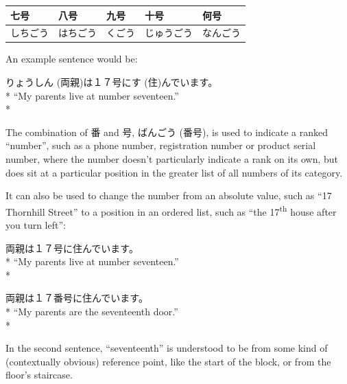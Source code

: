 \documentclass[11pt, b5paper, twoside, openright, onecolumn]{book}
\makeatletter
\newcommand*{\rubystack}[2]{{\relscale{0.5}%
  \begin{tabular}[b]{@{}c@{}}%
    {#1}\\%
   {\textscale{2}{#2}}%
  \end{tabular}}%
}
\DeclareRobustCommand*{\ruby}[2]{%
  \mbox{%
    \setlength{\parskip}{0ex}%
    \BeginAccSupp{method=pdfstringdef,ActualText={#1}}%
      \rubystack{\phantom{#2}}{#1}%
      \llap{%
        \rubystack{#2}{\phantom{#1}}%
      }%
    \EndAccSupp{}%
  }%
}
\renewcommand*{\ruby}[2]{#2 (#1)}%
\newenvironment{exampleblock}{
\setlength{\parindent}{0.6in}
\begin{minipage}[t]{\dimexpr\textwidth-\parindent}}
{\end{minipage}}
\newenvironment{mytabular}[1]{\noindent\hspace{0.4in}
\begin{tabular}[h]{#1}}{\end{tabular}}
\makeatother
\begin{document}
\smaller
\begin{mytabular}{| l  l  l  l  l |}\hline 
\rule{0pt}{2.4ex}七号 & 八号 & 九号 & 十号 & 何号\\ 
\hline
\rule{0pt}{2.4ex}しちごう & はちごう & くごう & じゅうごう & なんごう\\ 
\hline 
\end{mytabular}
\larger
\vspace{0.5cm}


An example sentence would be:

\vspace{0.4cm}
\begin{exampleblock}
\ruby{両親}{りょうしん}は１７号に\ruby{住}{す}んでいます。 \\* 
“My parents live at number seventeen.” \\* 
\end{exampleblock}
\vspace{0.2cm}

The combination of 番 and 号‚ \ruby{番号}{ばんごう}‚ is used to indicate a ranked “number”‚ such as a phone number‚ registration number or product serial number‚ where the number doesn’t particularly indicate a rank on its own‚ but does sit at a particular position in the greater list of all numbers of its category.

It can also be used to change the number from an absolute value‚ such as “17 Thornhill Street” to a position in an ordered list‚ such as “the 17\textsuperscript{th} house after you turn left”:

\vspace{0.4cm}
\begin{exampleblock}
両親は１７号に住んでいます。 \\* 
“My parents live at number seventeen.” \\* 
\end{exampleblock}
\vspace{0.2cm}

\begin{exampleblock}
両親は１７番号に住んでいます。 \\* 
“My parents are the seventeenth door.” \\* 
\end{exampleblock}
\vspace{0.2cm}
In the second sentence‚ “seventeenth” is understood to be from some kind of (contextually obvious) reference point‚ like the start of the block‚ or from the floor’s staircase.
\end{document}
